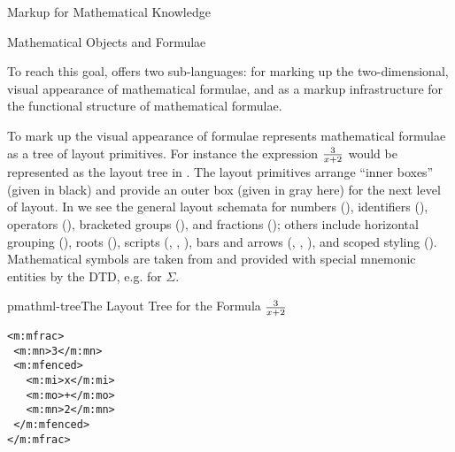 \begin{omgroup}[id=math-markup]{Markup for Mathematical Knowledge}
\begin{omgroup}[id=math-objects]{Mathematical Objects and Formulae}
\begin{omgroup}[id=math-markup.mathml]{\mathml}
 To reach this goal, {\mathml} offers two sub-languages: {\pmathml} for marking up the
 two-dimensional, visual appearance of mathematical formulae, and {\cmathml} as a markup
 infrastructure for the functional structure of mathematical formulae.

 To mark up the visual appearance of formulae {\pmathml} represents mathematical formulae
 as a tree of layout primitives. For instance the expression $3\over x+2$ would be
 represented as the layout tree in {}. The layout primitives
 arrange ``inner boxes'' (given in black) and provide an outer box (given in gray here)
 for the next level of layout. In {} we see the general layout
 schemata for numbers ({}), identifiers ({}),
 operators ({}), bracketed groups ({}),
 and fractions ({}); others include horizontal grouping
 ({}), roots ({}), scripts
 ({}, {}, {}),
 bars and arrows ({}, {},
 {}), and scoped {\css} styling
 ({}). Mathematical symbols are taken from {\unicode} and
 provided with special mnemonic entities by the {\mathml} DTD, e.g. {} for
 $\Sigma$.

    \begin{myfig}{pmathml-tree}{The Layout Tree for the Formula $3\over x+2$}
\begin{minipage}{2.4cm}
\begin{lstlisting}[numbers=none,frame=none]
<m:mfrac>
 <m:mn>3</m:mn>
 <m:mfenced>
   <m:mi>x</m:mi>
   <m:mo>+</m:mo>
   <m:mn>2</m:mn>
 </m:mfenced>
</m:mfrac>
\end{lstlisting}
\end{minipage}\hspace{2em}
      \begin{minipage}{8cm}
\end{minipage}
\end{myfig}
\end{omgroup}
\end{omgroup}
\end{omgroup}
